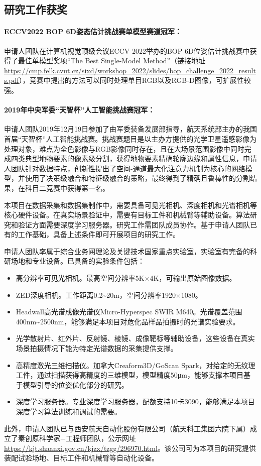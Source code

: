 \documentclass[12pt]{article}
\newcommand{\myPara}[1]{\paragraph{#1：}}
\begin{document}
\subsection{研究工作获奖}

\myPara{ECCV2022 BOP 6D姿态估计挑战赛单模型赛道冠军}
申请人团队在计算机视觉顶级会议ECCV 2022举办的BOP 6D位姿估计挑战赛中获得了最佳单模型奖项“The Best Single-Model Method”（链接地址\url{https://cmp.felk.cvut.cz/sixd/workshop_2022/slides/bop_challenge_2022_results.pdf}），竞赛中提出的方法可以同时处理单目RGB以及RGB-D图像，可扩展性较强。

\myPara{2019年中央军委“天智杯”人工智能挑战赛冠军}
申请人团队2019年12月19日参加了由军委装备发展部指导，航天系统部主办的我国首届“天智杯”人工智能挑战赛。挑战赛题目是以主办方提供的光学卫星遥感影像为处理对象，难点为全色影像与RGB影像同时存在，且在大场景范围影像中同时完成四类典型地物要素的像素级分割，获得地物要素精确轮廓边缘和属性信息，申请人团队针对数据特点，创新性提出了空间-通道最大化注意力机制为核心的网络模型，并使用了决策级融合和特征级融合的策略，最终得到了精确且鲁棒性的分割结果，在科目二竞赛中获得第一名。


本项目在数据采集和数据集制作中，需要具备可见光相机、深度相机和光谱相机等核心硬件设备。在真实场景验证中，需要有目标工件和机械臂等辅助设备。算法研究和验证方面需要深度学习服务器。研究工作需团队成员协作。基于申请人团队已有的工作基础，具备上述条件即可开展项目的研究工作。

申请人团队率属于综合业务网理论及关键技术国家重点实验室，实验室有完备的科研场地和专业设备。已具备的实验条件包括：
\begin{itemize}
    \item 高分辨率可见光相机。最高空间分辨率5K×4K，可输出原始图像数据。
    \item ZED深度相机。工作距离0.2\textasciitilde20m，空间分辨率1920×1080。
    \item Headwall高光谱成像光谱仪Micro-Hyperspec SWIR M640。光谱覆盖范围400nm\textasciitilde2500nm，能够满足本项目对危化品样品拍摄时的光谱实验要求。
    \item 光学散射片、红外片、反射镜、棱镜、成像靶标等辅助设备，这些设备在真实场景拍摄情况下能为特定光谱数据的采集提供支撑。
    \item 高精度激光三维扫描仪。加拿大Creaform3D/GoScan Spark，对给定的无纹理工件，通过扫描获得高精度的三维模型，模型精度50μm，能够支撑本项目基于模型引导的位姿优化部分的研究。
    \item 深度学习服务器。专业深度学习服务器，配额支持10卡3090，能够满足本项目深度学习算法训练和调试的需要。
\end{itemize}
此外，申请人团队已与西安航天自动化股份有限公司（航天科工集团六院下属）成立了秦创原科学家+工程师团队，公示网址\url{https://kjt.shaanxi.gov.cn/kjzx/tzgg/296970.html}。该公司可为本项目的研究提供装配试验场地、目标工件和机械臂等自动化设备。
\end{document}
